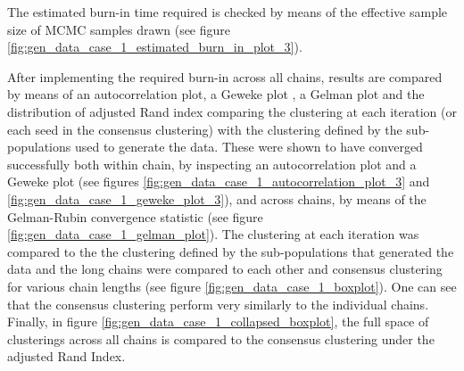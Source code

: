 \documentclass[12pt]{article} %
\begin{document}
	The estimated burn-in time required is checked by means of the effective sample size of MCMC samples drawn (see figure \ref{fig:gen_data_case_1_estimated_burn_in_plot_3}).
	
	After implementing the required burn-in across all chains, results are compared by means of an autocorrelation plot, a Geweke plot \cite{GewekeEvaluatingAccuracySamplingBased}, a Gelman plot \cite{GelmanInferenceIterativeSimulation1992} and the distribution of adjusted Rand index comparing the clustering at each iteration (or each seed in the consensus clustering) with the clustering defined by the sub-populations used to generate the data. These were shown to have converged successfully both within chain, by inspecting an autocorrelation plot and a Geweke plot (see figures \ref{fig:gen_data_case_1_autocorrelation_plot_3} and \ref{fig:gen_data_case_1_geweke_plot_3}), and across chains, by means of the Gelman-Rubin convergence statistic (see figure \ref{fig:gen_data_case_1_gelman_plot}). The clustering at each iteration was compared to the the clustering defined by the sub-populations that generated the data and the long chains were compared to each other and consensus clustering for various chain lengths (see figure \ref{fig:gen_data_case_1_boxplot}). One can see that the consensus clustering perform very similarly to the individual chains. Finally, in figure \ref{fig:gen_data_case_1_collapsed_boxplot}, the full space of clusterings across all chains is compared to the consensus clustering under the adjusted Rand Index.
\end{document}
